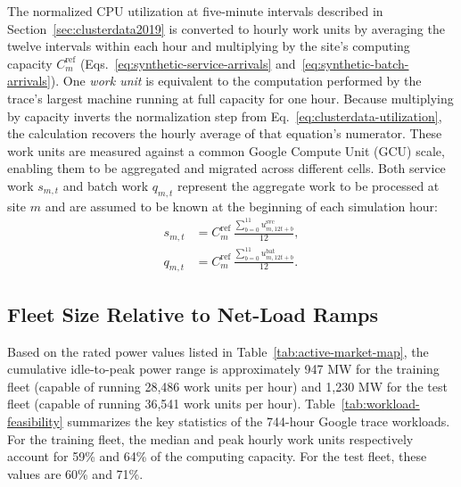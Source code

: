 \documentclass{UNCC-thesis}
\begin{document}
The normalized CPU utilization at five-minute intervals described in
Section~\ref{sec:clusterdata2019} is converted to hourly work units by averaging the
twelve intervals within each hour and multiplying by the site's computing capacity
\(C^{\mathrm{ref}}_m\)
(Eqs.~\ref{eq:synthetic-service-arrivals} and~\ref{eq:synthetic-batch-arrivals}).
One \emph{work unit} is equivalent to the computation performed by the trace's largest
machine running at full capacity for one hour.
Because multiplying by capacity inverts the normalization step from
Eq.~\eqref{eq:clusterdata-utilization}, the calculation recovers the hourly average of that
equation's numerator. These work units are measured against a common Google Compute Unit (GCU)
scale, enabling them to be aggregated and migrated across different cells.
Both service work \(s_{m,t}\) and batch work \(q_{m,t}\) represent the aggregate work to be
processed at site \(m\) and are assumed to be known at the beginning of each simulation
hour:
\begin{align}
  s_{m,t}
  &=
  C^{\mathrm{ref}}_m\,
  \frac{\displaystyle\sum_{b=0}^{11} u^{\mathrm{svc}}_{m,12t+b}}{12},
  \label{eq:synthetic-service-arrivals}\\[6pt]
  q_{m,t}
  &=
  C^{\mathrm{ref}}_m\,
  \frac{\displaystyle\sum_{b=0}^{11} u^{\mathrm{bat}}_{m,12t+b}}{12}.
  \label{eq:synthetic-batch-arrivals}
\end{align}

\subsection{Fleet Size Relative to Net-Load Ramps}
\label{subsec:transform-control-authority}

Based on the rated power values listed in Table~\ref{tab:active-market-map}, the
cumulative idle-to-peak power range is approximately 947 MW for the training fleet
(capable of running 28,486 work units per hour) and 1,230 MW for the test fleet
(capable of running 36,541 work units per hour).
Table~\ref{tab:workload-feasibility} summarizes the key statistics of the 744-hour
Google trace workloads. For the training fleet, the median and peak hourly work
units respectively account for 59\% and 64\% of the computing capacity. For the test
fleet, these values are 60\% and 71\%.
\end{document}
